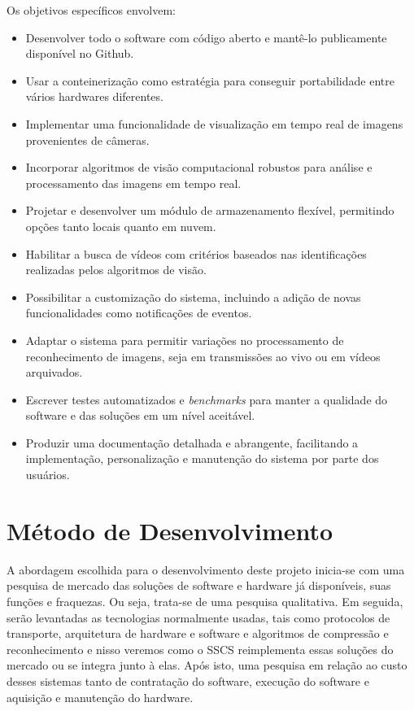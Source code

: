 \documentclass[12pt, %
openright, 
oneside, %
a4paper,    %
brazil]{facom-ufu-abntex2}
\begin{document}
Os objetivos específicos envolvem:

\begin{itemize}
	\item Desenvolver todo o software com código aberto e mantê-lo publicamente
	      disponível no Github.
	\item Usar a conteinerização como estratégia para conseguir portabilidade entre
	      vários hardwares diferentes.
	\item Implementar uma funcionalidade de visualização em tempo real de imagens
	      provenientes de câmeras.
	\item Incorporar algoritmos de visão computacional robustos para análise e
	      processamento das imagens em tempo real.
	\item Projetar e desenvolver um módulo de armazenamento flexível, permitindo opções
	      tanto locais quanto em nuvem.
	\item Habilitar a busca de vídeos com critérios baseados nas identificações
	      realizadas pelos algoritmos de visão.
	\item Possibilitar a customização do sistema, incluindo a adição de novas
	      funcionalidades como notificações de eventos.
	\item Adaptar o sistema para permitir variações no processamento de reconhecimento de
	      imagens, seja em transmissões ao vivo ou em vídeos arquivados.
	\item Escrever testes automatizados e \textit{\foreignlanguage{english}{benchmarks}}
	      para manter a qualidade do software e das soluções em um nível aceitável.
	\item Produzir uma documentação detalhada e abrangente, facilitando a implementação,
	      personalização e manutenção do sistema por parte dos usuários.
\end{itemize}


\chapter{Método de Desenvolvimento}

A abordagem escolhida para o desenvolvimento deste projeto inicia-se com uma
pesquisa de mercado das soluções de software e hardware já disponíveis, suas
funções e fraquezas. Ou seja, trata-se de uma pesquisa qualitativa. Em seguida,
serão levantadas as tecnologias normalmente usadas, tais como protocolos de
transporte, arquitetura de hardware e software e algoritmos de compressão e
reconhecimento e nisso veremos como o SSCS reimplementa essas soluções do
mercado ou se integra junto à elas. Após isto, uma pesquisa em relação ao custo
desses sistemas tanto de contratação do software, execução do software e
aquisição e manutenção do hardware.
\end{document}
